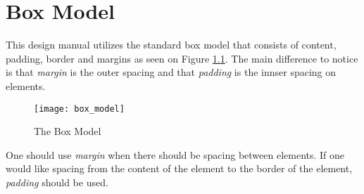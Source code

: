 \chapter{Box Model}
\label{cha:box_model}

This design manual utilizes the standard box model that consists of content, padding, border and margins as seen on Figure \ref{fig:box_model}. The main difference to notice is that \emph{margin} is the outer spacing and that \emph{padding} is the innser spacing on elements. 

\begin{figure}[h]
	\centering
	\texttt{[image: box\_model]}
	\caption{The Box Model}
	\label{fig:box_model}
\end{figure}

One should use \emph{margin} when there should be spacing between elements. If one would like spacing from the content of the element to the border of the element, \emph{padding} should be used.

